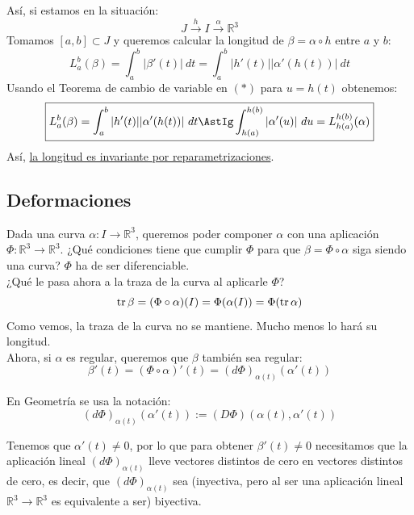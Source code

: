 Así, si estamos en la situación:
\begin{equation*}
    J\stackrel{h}{\to}I\stackrel{\alpha}{\to}\mathbb{R}^3
\end{equation*}
Tomamos $[a,b]\subset J$ y queremos calcular la longitud de $\beta = \alpha\circ h$ entre $a$ y $b$:
\begin{equation*}
    L_a^b(\beta) = \int_{a}^{b} |\beta'(t)|~dt  = \int_{a}^{b} |h'(t)||\alpha'(h(t))|~dt 
\end{equation*}
Usando el Teorema de cambio de variable en $(\ast)$ para $u = h(t)$ obtenemos:
\begin{equation*}
    \boxed{
    L_a^b(\beta) = \int_{a}^{b} |h'(t)||\alpha'(h(t))|~dt \AstIg \int_{h(a)}^{h(b)} |\alpha'(u)|~du  = L_{h(a)}^{h(b)}(\alpha)}
\end{equation*}
Así, \underline{la longitud es invariante por reparametrizaciones}.

\subsection{Deformaciones}
\noindent
Dada una curva $\alpha:I\to \mathbb{R}^3$, queremos poder componer $\alpha$ con una aplicación $\Phi:\mathbb{R}^3\to \mathbb{R}^3$. ¿Qué condiciones tiene que cumplir $\Phi$ para que $\beta = \Phi\circ \alpha$ siga siendo una curva? $\Phi$ ha de ser diferenciable.\\

\noindent
¿Qué le pasa ahora a la traza de la curva al aplicarle $\Phi$?
\begin{equation*}
    \operatorname{tr} \beta = (\Phi\circ \alpha)(I) = \Phi(\alpha(I)) = \Phi(\operatorname{tr}\alpha)
\end{equation*}
Como vemos, la traza de la curva no se mantiene. Mucho menos lo hará su longitud.\\

\noindent
Ahora, si $\alpha$ es regular, queremos que $\beta$ también sea regular:
\begin{equation*}
    \beta'(t) = (\Phi\circ \alpha)'(t) = (d\Phi)_{\alpha(t)} (\alpha'(t))
\end{equation*}

\begin{notacion}
    En Geometría se usa la notación:
    \begin{equation*}
        (d\Phi)_{\alpha(t)}(\alpha'(t)) := (D\Phi)(\alpha(t), \alpha'(t))
    \end{equation*}
\end{notacion}
\noindent
Tenemos que $\alpha'(t)\neq 0$, por lo que para obtener $\beta'(t)\neq 0$ necesitamos que la aplicación lineal $(d\Phi)_{\alpha(t)}$ lleve vectores distintos de cero en vectores distintos de cero, es decir, que $(d\Phi)_{\alpha(t)}$ sea (inyectiva, pero al ser una aplicación lineal $\mathbb{R}^3\to\mathbb{R}^3$ es equivalente a ser) biyectiva.\\

